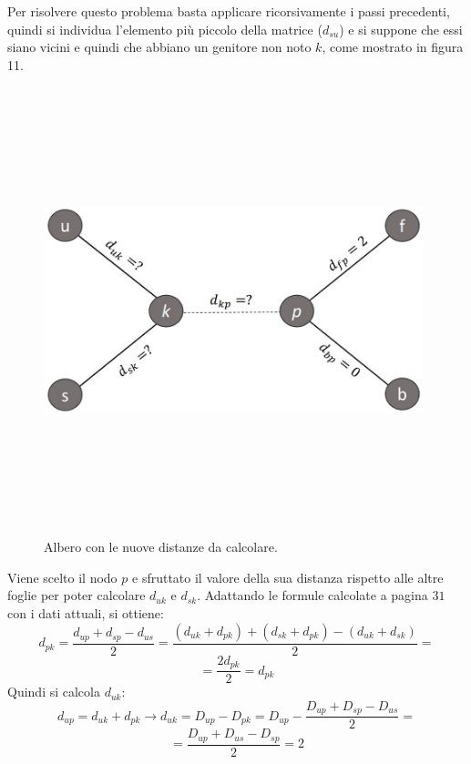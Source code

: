 Per risolvere questo problema basta applicare ricorsivamente i passi precedenti, quindi si individua l'elemento più piccolo della matrice ($d_{su}$) e si suppone che essi siano vicini e quindi che abbiano un genitore non noto $k$, come mostrato in figura 11.
\newpage
\begin{figure}[h!]
\centering
	\includegraphics[height=13cm, width=11cm, keepaspectratio]{distance_between_s_u.jpg}
 	\caption{Albero con le nuove distanze da calcolare.}
  	\label{fig:neighborsleaves_3}
\end{figure}
Viene scelto il nodo $p$ e sfruttato il valore della sua distanza rispetto alle altre foglie per poter calcolare $d_{uk}$ e $d_{sk}$. Adattando le formule calcolate a pagina $31$ con i dati attuali, si ottiene:
\[d_{pk}=\frac{d_{up}+d_{sp}-d_{us}}2=
\frac{(d_{uk}+d_{pk})+(d_{sk}+d_{pk})-(d_{uk}+d_{sk})}2=\]
\[=\frac{2d_{pk}}2=d_{pk}
\]
Quindi si calcola $d_{uk}$:
\[d_{up}=d_{uk}+d_{pk} \rightarrow d_{uk}=D_{up}-D_{pk}=D_{up}-\frac{D_{up}+D_{sp}-D_{us}}2=\]
\[=\frac{D_{up}+D_{us}-D_{sp}}2=2\]

